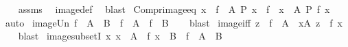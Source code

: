 \begin{isabellebody}
%
\isadelimproof
\ \ %
\endisadelimproof
%
\isatagproof
{}\isamarkupfalse%
\ assms\ \isamarkupfalse%
\ image{\isacharunderscore}{\kern0pt}def\ \isamarkupfalse%
\ blast%
\endisatagproof
{\isafoldproof}%
%
\isadelimproof
\isanewline
%
\endisadelimproof
\isanewline
{}\isamarkupfalse%
\ Compr{\isacharunderscore}{\kern0pt}image{\isacharunderscore}{\kern0pt}eq{\isacharcolon}{\kern0pt}\ {\isachardoublequoteopen}{\isacharbraceleft}{\kern0pt}x\ {\isasymin}\ f\ {\isacharbackquote}{\kern0pt}\ A{\isachardot}{\kern0pt}\ P\ x{\isacharbraceright}{\kern0pt}\ {\isacharequal}{\kern0pt}\ f\ {\isacharbackquote}{\kern0pt}\ {\isacharbraceleft}{\kern0pt}x\ {\isasymin}\ A{\isachardot}{\kern0pt}\ P\ {\isacharparenleft}{\kern0pt}f\ x{\isacharparenright}{\kern0pt}{\isacharbraceright}{\kern0pt}{\isachardoublequoteclose}\isanewline
%
\isadelimproof
\ \ %
\endisadelimproof
%
\isatagproof
{}\isamarkupfalse%
\ auto%
\endisatagproof
{\isafoldproof}%
%
\isadelimproof
\isanewline
%
\endisadelimproof
\isanewline
{}\isamarkupfalse%
\ image{\isacharunderscore}{\kern0pt}Un{\isacharcolon}{\kern0pt}\ {\isachardoublequoteopen}f\ {\isacharbackquote}{\kern0pt}\ {\isacharparenleft}{\kern0pt}A\ {\isasymunion}\ B{\isacharparenright}{\kern0pt}\ {\isacharequal}{\kern0pt}\ f\ {\isacharbackquote}{\kern0pt}\ A\ {\isasymunion}\ f\ {\isacharbackquote}{\kern0pt}\ B{\isachardoublequoteclose}\isanewline
%
\isadelimproof
\ \ %
\endisadelimproof
%
\isatagproof
{}\isamarkupfalse%
\ blast%
\endisatagproof
{\isafoldproof}%
%
\isadelimproof
\isanewline
%
\endisadelimproof
\isanewline
{}\isamarkupfalse%
\ image{\isacharunderscore}{\kern0pt}iff{\isacharcolon}{\kern0pt}\ {\isachardoublequoteopen}z\ {\isasymin}\ f\ {\isacharbackquote}{\kern0pt}\ A\ {\isasymlongleftrightarrow}\ {\isacharparenleft}{\kern0pt}{\isasymexists}x{\isasymin}A{\isachardot}{\kern0pt}\ z\ {\isacharequal}{\kern0pt}\ f\ x{\isacharparenright}{\kern0pt}{\isachardoublequoteclose}\isanewline
%
\isadelimproof
\ \ %
\endisadelimproof
%
\isatagproof
{}\isamarkupfalse%
\ blast%
\endisatagproof
{\isafoldproof}%
%
\isadelimproof
\isanewline
%
\endisadelimproof
\isanewline
{}\isamarkupfalse%
\ image{\isacharunderscore}{\kern0pt}subsetI{\isacharcolon}{\kern0pt}\ {\isachardoublequoteopen}{\isacharparenleft}{\kern0pt}{\isasymAnd}x{\isachardot}{\kern0pt}\ x\ {\isasymin}\ A\ {\isasymLongrightarrow}\ f\ x\ {\isasymin}\ B{\isacharparenright}{\kern0pt}\ {\isasymLongrightarrow}\ f\ {\isacharbackquote}{\kern0pt}\ A\ {\isasymsubseteq}\ B{\isachardoublequoteclose}\isanewline

\end{isabellebody}
